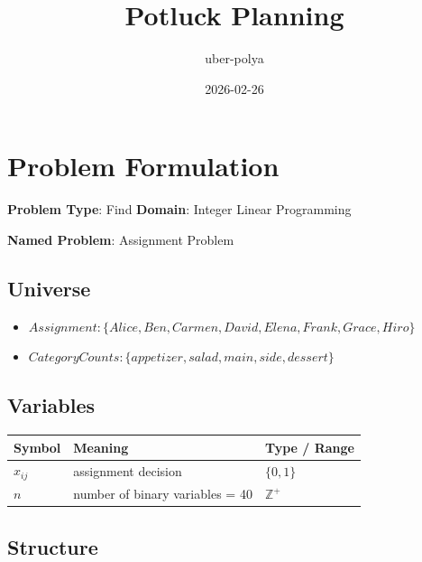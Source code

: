 \documentclass[11pt, a4paper]{article}
\title{Potluck Planning}
\author{uber-polya}
\date{2026-02-26}
\begin{document}
\maketitle
\tableofcontents
\newpage

\section{Problem Formulation}

\begin{polyamodel}

\textbf{Problem Type}: Find \hfill
\textbf{Domain}: Integer Linear Programming

\textbf{Named Problem}: Assignment Problem

\end{polyamodel}

\subsection{Universe}

\begin{itemize}
  \item $Assignment: \{Alice, Ben, Carmen, David, Elena, Frank, Grace, Hiro\}$
  \item $Category Counts: \{appetizer, salad, main, side, dessert\}$
\end{itemize}

\subsection{Variables}

\begin{longtable}{lll}
\toprule
\textbf{Symbol} & \textbf{Meaning} & \textbf{Type / Range} \\
\midrule
\endhead
$x_{ij}$ & assignment decision & $\{0, 1\}$ \\
$n$ & number of binary variables = 40 & $\mathbb{{Z}}^+$ \\
\bottomrule
\end{longtable}

\subsection{Structure}
\end{document}
